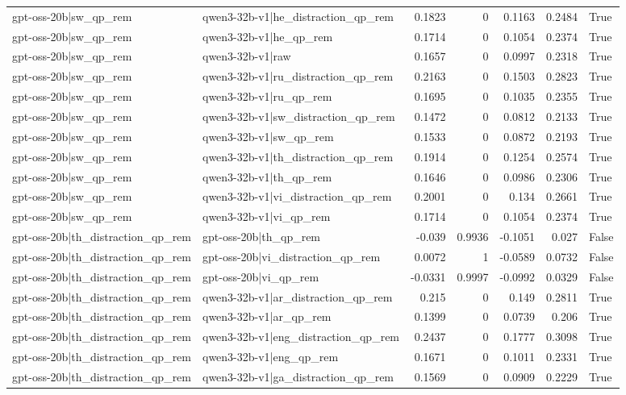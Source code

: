 \begin{table}
\begin{tabular}{l l r r r r l}
gpt-oss-20b|sw_qp_rem & qwen3-32b-v1|he_distraction_qp_rem & 0.1823 & 0 & 0.1163 & 0.2484 & True \\
gpt-oss-20b|sw_qp_rem & qwen3-32b-v1|he_qp_rem & 0.1714 & 0 & 0.1054 & 0.2374 & True \\
gpt-oss-20b|sw_qp_rem & qwen3-32b-v1|raw & 0.1657 & 0 & 0.0997 & 0.2318 & True \\
gpt-oss-20b|sw_qp_rem & qwen3-32b-v1|ru_distraction_qp_rem & 0.2163 & 0 & 0.1503 & 0.2823 & True \\
gpt-oss-20b|sw_qp_rem & qwen3-32b-v1|ru_qp_rem & 0.1695 & 0 & 0.1035 & 0.2355 & True \\
gpt-oss-20b|sw_qp_rem & qwen3-32b-v1|sw_distraction_qp_rem & 0.1472 & 0 & 0.0812 & 0.2133 & True \\
gpt-oss-20b|sw_qp_rem & qwen3-32b-v1|sw_qp_rem & 0.1533 & 0 & 0.0872 & 0.2193 & True \\
gpt-oss-20b|sw_qp_rem & qwen3-32b-v1|th_distraction_qp_rem & 0.1914 & 0 & 0.1254 & 0.2574 & True \\
gpt-oss-20b|sw_qp_rem & qwen3-32b-v1|th_qp_rem & 0.1646 & 0 & 0.0986 & 0.2306 & True \\
gpt-oss-20b|sw_qp_rem & qwen3-32b-v1|vi_distraction_qp_rem & 0.2001 & 0 & 0.134 & 0.2661 & True \\
gpt-oss-20b|sw_qp_rem & qwen3-32b-v1|vi_qp_rem & 0.1714 & 0 & 0.1054 & 0.2374 & True \\
gpt-oss-20b|th_distraction_qp_rem & gpt-oss-20b|th_qp_rem & -0.039 & 0.9936 & -0.1051 & 0.027 & False \\
gpt-oss-20b|th_distraction_qp_rem & gpt-oss-20b|vi_distraction_qp_rem & 0.0072 & 1 & -0.0589 & 0.0732 & False \\
gpt-oss-20b|th_distraction_qp_rem & gpt-oss-20b|vi_qp_rem & -0.0331 & 0.9997 & -0.0992 & 0.0329 & False \\
gpt-oss-20b|th_distraction_qp_rem & qwen3-32b-v1|ar_distraction_qp_rem & 0.215 & 0 & 0.149 & 0.2811 & True \\
gpt-oss-20b|th_distraction_qp_rem & qwen3-32b-v1|ar_qp_rem & 0.1399 & 0 & 0.0739 & 0.206 & True \\
gpt-oss-20b|th_distraction_qp_rem & qwen3-32b-v1|eng_distraction_qp_rem & 0.2437 & 0 & 0.1777 & 0.3098 & True \\
gpt-oss-20b|th_distraction_qp_rem & qwen3-32b-v1|eng_qp_rem & 0.1671 & 0 & 0.1011 & 0.2331 & True \\
gpt-oss-20b|th_distraction_qp_rem & qwen3-32b-v1|ga_distraction_qp_rem & 0.1569 & 0 & 0.0909 & 0.2229 & True \\

\end{tabular}
\end{table}
